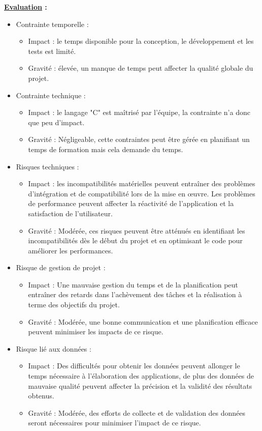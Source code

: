 \documentclass[a4paper, 12pt]{report}
\begin{document}
\textbf{\underline{Evaluation} :}
\begin{itemize}
    \item Contrainte temporelle :
    \begin{itemize}
        \item Impact : le temps disponible pour la conception, le développement et les tests est limité.
        \item Gravité : élevée, un manque de temps peut affecter la qualité globale du projet.
    \end{itemize}
    \item Contrainte technique :
    \begin{itemize}
        \item Impact : le langage "C" est maîtrisé par l'équipe, la contrainte n'a donc que peu d'impact.
        \item Gravité : Négligeable, cette contraintes peut être gérée en planifiant un temps de formation mais cela demande du temps.
    \end{itemize}
    \clearpage %
    
    \item Risques techniques :
    \begin{itemize}
        \item Impact : les incompatibilités matérielles peuvent entraîner des problèmes d'intégration et de compatibilité lors de la mise en œuvre. Les problèmes de performance peuvent affecter la réactivité de l'application et la satisfaction de l'utilisateur.
        \item Gravité : Modérée, ces risques peuvent être atténués en identifiant les incompatibilités dès le début du projet et en optimisant le code pour améliorer les performances.
    \end{itemize}
    \item Risque de gestion de projet :
    \begin{itemize}
        \item Impact : Une mauvaise gestion du temps et de la planification peut entraîner des retards dans l'achèvement des tâches et la réalisation à terme des objectifs du projet.
        \item Gravité : Modérée, une bonne communication et une planification efficace peuvent minimiser les impacts de ce risque.
    \end{itemize}
    \item Risque lié aux données :
    \begin{itemize}
        \item Impact : Des difficultés pour obtenir les données peuvent allonger le temps nécessaire à l'élaboration des applications, de plus des données de mauvaise qualité peuvent affecter la précision et la validité des résultats obtenus.
        \item Gravité : Modérée, des efforts de collecte et de validation des données seront nécessaires pour minimiser l'impact de ce risque.
    \end{itemize}
\end{itemize}
\bigskip
\end{document}
